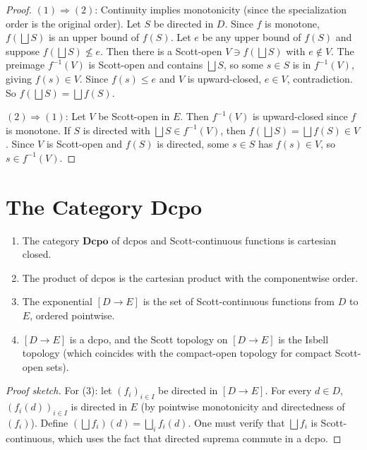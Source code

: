 \begin{proof}
$(1) \Rightarrow (2)$: Continuity implies monotonicity (since the specialization order is
the original order). Let $S$ be directed in $D$. Since $f$ is monotone, $f(\bigsqcup S)$
is an upper bound of $f(S)$. Let $e$ be any upper bound of $f(S)$ and suppose
$f(\bigsqcup S) \not\leq e$. Then there is a Scott-open $V \ni f(\bigsqcup S)$ with
$e \notin V$. The preimage $f^{-1}(V)$ is Scott-open and contains $\bigsqcup S$, so some
$s \in S$ is in $f^{-1}(V)$, giving $f(s) \in V$. Since $f(s) \leq e$ and $V$ is
upward-closed, $e \in V$, contradiction. So $f(\bigsqcup S) = \bigsqcup f(S)$.

$(2) \Rightarrow (1)$: Let $V$ be Scott-open in $E$. Then $f^{-1}(V)$ is upward-closed
since $f$ is monotone. If $S$ is directed with $\bigsqcup S \in f^{-1}(V)$, then
$f(\bigsqcup S) = \bigsqcup f(S) \in V$. Since $V$ is Scott-open and $f(S)$ is directed,
some $s \in S$ has $f(s) \in V$, so $s \in f^{-1}(V)$.
\end{proof}

\section{The Category $\mathbf{Dcpo}$}

\begin{theorem}
\begin{enumerate}
  \item The category $\mathbf{Dcpo}$ of dcpos and Scott-continuous functions is cartesian
    closed.
  \item The product of dcpos is the cartesian product with the componentwise order.
  \item The exponential $[D \to E]$ is the set of Scott-continuous functions from $D$ to
    $E$, ordered pointwise.
  \item $[D \to E]$ is a dcpo, and the Scott topology on $[D \to E]$ is the Isbell
    topology (which coincides with the compact-open topology for compact Scott-open sets).
\end{enumerate}
\end{theorem}

\begin{proof}[Proof sketch]
For (3): let $(f_i)_{i\in I}$ be directed in $[D \to E]$. For every $d \in D$,
$(f_i(d))_{i\in I}$ is directed in $E$ (by pointwise monotonicity and directedness of
$(f_i)$). Define $(\bigsqcup f_i)(d) = \bigsqcup_i f_i(d)$. One must verify that
$\bigsqcup f_i$ is Scott-continuous, which uses the fact that directed suprema commute in
a dcpo.
\end{proof}

